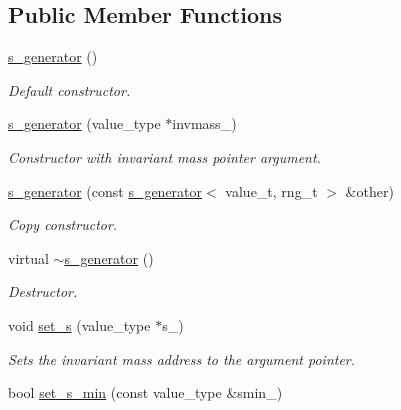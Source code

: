 \subsection*{Public Member Functions}
\begin{DoxyCompactItemize}
\item 
\hypertarget{a00482_a83225de87ced0c6e27b94d3d63d5bea2}{\hyperlink{a00482_a83225de87ced0c6e27b94d3d63d5bea2}{s\-\_\-generator} ()}\label{a00482_a83225de87ced0c6e27b94d3d63d5bea2}

\begin{DoxyCompactList}\small\item\em Default constructor. \end{DoxyCompactList}\item 
\hypertarget{a00482_a7f9b51646b7286dd01a3c10063baf530}{\hyperlink{a00482_a7f9b51646b7286dd01a3c10063baf530}{s\-\_\-generator} (value\-\_\-type $\ast$invmass\-\_\-)}\label{a00482_a7f9b51646b7286dd01a3c10063baf530}

\begin{DoxyCompactList}\small\item\em Constructor with invariant mass pointer argument. \end{DoxyCompactList}\item 
\hypertarget{a00482_afe847679b08eb272895f4b62ca7a766e}{\hyperlink{a00482_afe847679b08eb272895f4b62ca7a766e}{s\-\_\-generator} (const \hyperlink{a00482}{s\-\_\-generator}$<$ value\-\_\-t, rng\-\_\-t $>$ \&other)}\label{a00482_afe847679b08eb272895f4b62ca7a766e}

\begin{DoxyCompactList}\small\item\em Copy constructor. \end{DoxyCompactList}\item 
\hypertarget{a00482_ac3937ce03d8f60d03b8d74d347bc7dba}{virtual \hyperlink{a00482_ac3937ce03d8f60d03b8d74d347bc7dba}{$\sim$s\-\_\-generator} ()}\label{a00482_ac3937ce03d8f60d03b8d74d347bc7dba}

\begin{DoxyCompactList}\small\item\em Destructor. \end{DoxyCompactList}\item 
\hypertarget{a00482_af147f46a20bba78d48c2a490be474667}{void \hyperlink{a00482_af147f46a20bba78d48c2a490be474667}{set\-\_\-s} (value\-\_\-type $\ast$s\-\_\-)}\label{a00482_af147f46a20bba78d48c2a490be474667}

\begin{DoxyCompactList}\small\item\em Sets the invariant mass address to the argument pointer. \end{DoxyCompactList}\item 
\hypertarget{a00482_af3f51c6dbcc89ec9a1a4381dd4ff1738}{bool \hyperlink{a00482_af3f51c6dbcc89ec9a1a4381dd4ff1738}{set\-\_\-s\-\_\-min} (const value\-\_\-type \&smin\-\_\-)}\label{a00482_af3f51c6dbcc89ec9a1a4381dd4ff1738}


\end{DoxyCompactItemize}

